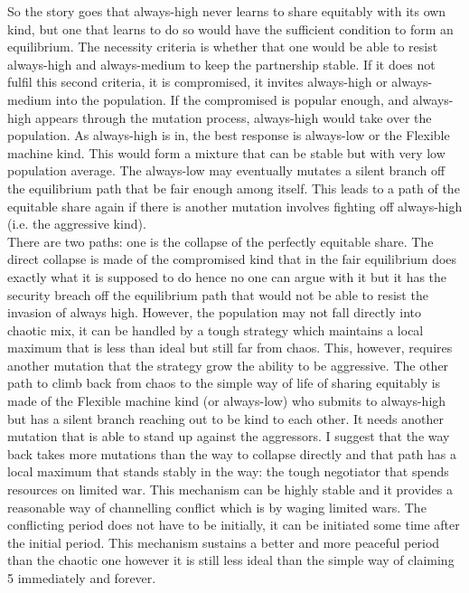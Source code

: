 \documentclass[12.5pt]{report}
\begin{document}
So the story goes that always-high never learns to share equitably with its own kind, but one that learns to do so would have the sufficient condition to form an equilibrium. The necessity criteria is whether that one would be able to resist always-high and always-medium to keep the partnership stable. If it does not fulfil this second criteria, it is compromised, it invites always-high or always-medium into the population. If the compromised is popular enough, and always-high appears through the mutation process, always-high would take over the population. As always-high is in, the best response is always-low or the Flexible machine kind. This would form a mixture that can be stable but with very low population average. The always-low may eventually mutates a silent branch off the equilibrium path that be fair enough among itself. This leads to a path of the equitable share again if there is another mutation involves fighting off always-high (i.e. the aggressive kind).\\

There are two paths: one is the collapse of the perfectly equitable share. The direct collapse is made of the compromised kind that in the fair equilibrium does exactly what it is supposed to do hence no one can argue with it but it has the security breach off the equilibrium path that would not be able to resist the invasion of always high. However, the population may not fall directly into chaotic mix, it can be handled by a tough strategy which maintains a local maximum that is less than ideal but still far from chaos. This, however, requires another mutation that the strategy grow the ability to be aggressive. The other path to climb back from chaos to the simple way of life of sharing equitably is made of the Flexible machine kind (or always-low) who submits to always-high but has a silent branch reaching out to be kind to each other. It needs another mutation that is able to stand up against the aggressors. I suggest that the way back takes more mutations than the way to collapse directly and that path has a local maximum that stands stably in the way: the tough negotiator that spends resources on limited war. This mechanism can be highly stable and it provides a reasonable way of channelling conflict which is by waging limited wars. The conflicting period does not have to be initially, it can be initiated some time after the initial period. This mechanism sustains a better and more peaceful period than the chaotic one however it is still less ideal than the simple way of claiming 5 immediately and forever.\\
\end{document}

